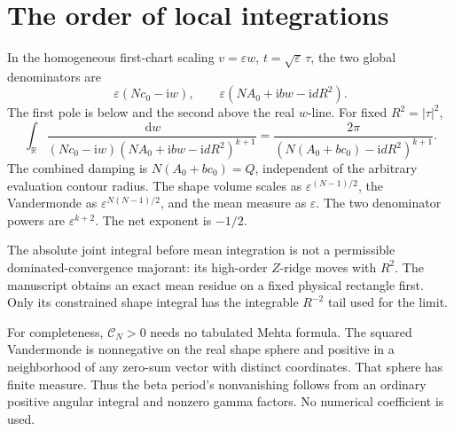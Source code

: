 \documentclass[11pt]{article}
\numberwithin{equation}{section}
\theoremstyle{definition}
\newcommand{\dd}{\,\mathrm d}
\newcommand{\ii}{\mathrm i}
\newcommand{\R}{\mathbb R}
\newcommand{\eps}{\varepsilon}
\begin{document}


\section{The order of local integrations}\label{app:local}
In the homogeneous first-chart scaling \(v=\eps w\),
\(t=\sqrt\eps\,\tau\), the two global denominators are
\[
 \eps(Nc_0-\ii w),\qquad
 \eps(NA_0+\ii bw-\ii dR^2).
\]
The first pole is below and the second above the real \(w\)-line.
For fixed \(R^2=|\tau|^2\),
\[
 \int_\R
 \frac{\dd w}{(Nc_0-\ii w)(NA_0+\ii bw-\ii dR^2)^{k+1}}
 =\frac{2\pi}{(N(A_0+bc_0)-\ii dR^2)^{k+1}}.
\]
The combined damping is \(N(A_0+bc_0)=Q\), independent of the arbitrary
evaluation contour radius. The shape volume scales as
\(\eps^{(N-1)/2}\), the Vandermonde as
\(\eps^{N(N-1)/2}\), and the mean measure as \(\eps\).
The two denominator powers are \(\eps^{k+2}\).
The net exponent is \(-1/2\).

The absolute joint integral before mean integration is not a permissible
dominated-convergence majorant: its high-order \(Z\)-ridge moves with
\(R^2\). The manuscript obtains an exact mean residue on a fixed physical
rectangle first. Only its constrained shape integral has the integrable
\(R^{-2}\) tail used for the limit.

For completeness, \(\mathscr C_N>0\) needs no tabulated Mehta formula.
The squared Vandermonde is nonnegative on the real shape sphere and
positive in a neighborhood of any zero-sum vector with distinct
coordinates. That sphere has finite measure. Thus the beta period's
nonvanishing follows from an ordinary positive angular integral and
nonzero gamma factors. No numerical coefficient is used.



\end{document}
